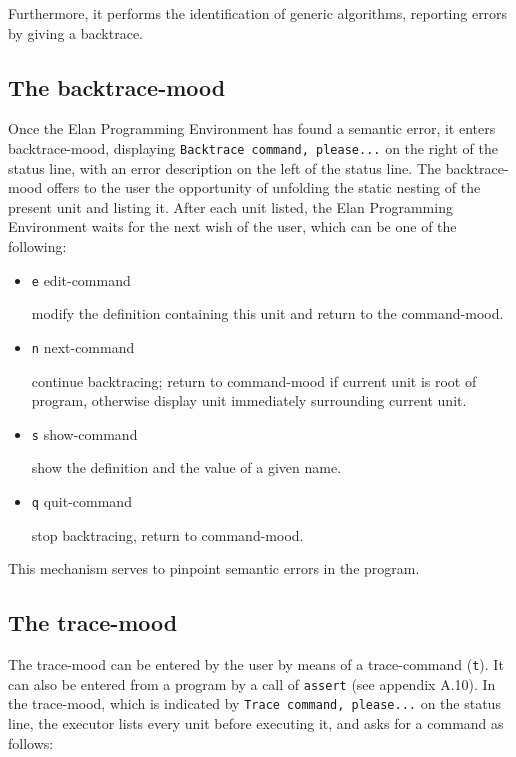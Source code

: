 \noindent
Furthermore, it performs the identification of generic algorithms,
reporting errors by giving a backtrace.

\subsection{The backtrace-mood}

Once the Elan Programming Environment has found a semantic
error, it enters backtrace-mood, displaying {\tt Backtrace command, please...}
on the right of the status line, with an error description on the left
of the status line. The backtrace-mood offers to the user the
opportunity of unfolding the static nesting of the present unit
and listing it. After each unit listed, the Elan Programming
Environment waits for the next wish of the user, which can be
one of the following:

\begin{itemize} 
\item{\tt e}        edit-command

modify the definition containing this unit and return to the
command-mood. 
\item{\tt n}        next-command

continue backtracing; return to command-mood if current unit
is root of program, otherwise display unit immediately surrounding
current unit. 
\item{\tt s}        show-command
 
show the definition and the value of a given name.
\item{\tt q}        quit-command

stop backtracing, return to command-mood.
\end{itemize}

\noindent
This mechanism serves to pinpoint semantic errors in the program.

\subsection{The trace-mood}
 
The trace-mood can be entered by the user by means of a trace-command
({\tt t}). It can also be entered from a program by a call of {\tt assert}
(see appendix A.10). In the trace-mood, which is indicated by
{\tt Trace command, please...} on the status line, the executor lists every unit
before executing it, and asks for a command as follows:

